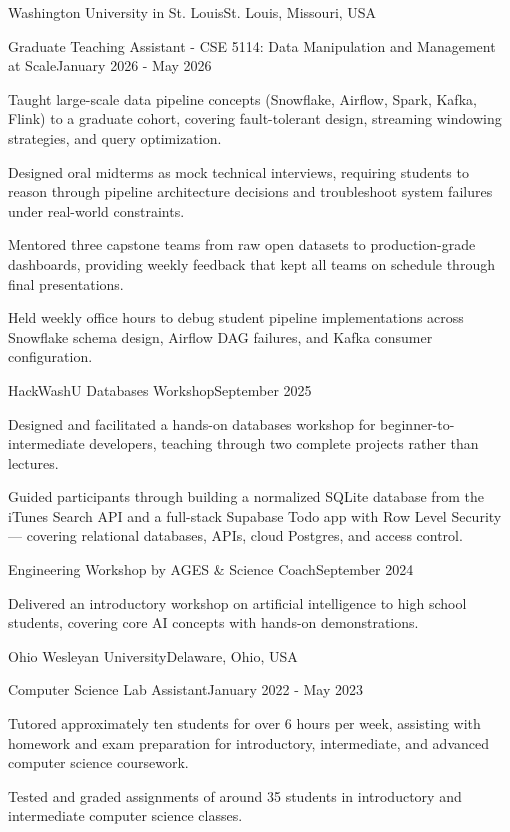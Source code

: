 \documentclass[10pt, letterpaper]{article}
\begin{document}
\begin{leadershipentry}{Washington University in St. Louis}{St. Louis, Missouri, USA}
	\begin{positionentry}{Graduate Teaching Assistant - CSE 5114: Data Manipulation and Management at Scale}{January 2026 - May 2026}
		\item Taught large-scale data pipeline concepts (Snowflake, Airflow, Spark, Kafka, Flink) to a graduate cohort, covering fault-tolerant design, streaming windowing strategies, and query optimization.
		\item Designed oral midterms as mock technical interviews, requiring students to reason through pipeline architecture decisions and troubleshoot system failures under real-world constraints.
		\item Mentored three capstone teams from raw open datasets to production-grade dashboards, providing weekly feedback that kept all teams on schedule through final presentations.
		\item Held weekly office hours to debug student pipeline implementations across Snowflake schema design, Airflow DAG failures, and Kafka consumer configuration.
	\end{positionentry}
	\begin{positionentry}{HackWashU Databases Workshop}{September 2025}
		\item Designed and facilitated a hands-on databases workshop for beginner-to-intermediate developers, teaching through two complete projects rather than lectures.
		\item Guided participants through building a normalized SQLite database from the iTunes Search API and a full-stack Supabase Todo app with Row Level Security — covering relational databases, APIs, cloud Postgres, and access control.
	\end{positionentry}
	\begin{positionentry}{Engineering Workshop by AGES \& Science Coach}{September 2024}
		\item Delivered an introductory workshop on artificial intelligence to high school students, covering core AI concepts with hands-on demonstrations.
	\end{positionentry}
\end{leadershipentry}

\begin{leadershipentry}{Ohio Wesleyan University}{Delaware, Ohio, USA}
	\begin{positionentry}{Computer Science Lab Assistant}{January 2022 - May 2023}
		\item Tutored approximately ten students for over 6 hours per week, assisting with homework and exam preparation for introductory, intermediate, and advanced computer science coursework.
		\item Tested and graded assignments of around 35 students in introductory and intermediate computer science classes.
	\end{positionentry}
\end{leadershipentry}
\end{document}
